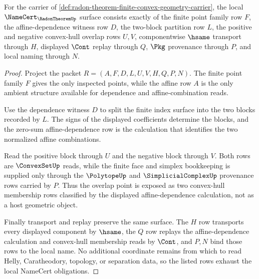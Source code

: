 \begin{theorem}
\label{thm:radon-theorem-namecert-obligations}
For the carrier of \autoref{def:radon-theorem-finite-convex-geometry-carrier}, the local $\NameCert_{\RadonTheoremUp}$ surface consists exactly of the finite point family row $F$, the affine-dependence witness row $D$, the two-block partition row $L$, the positive and negative convex-hull overlap rows $U,V$, componentwise $\hsame$ transport through $H$, displayed $\Cont$ replay through $Q$, $\Pkg$ provenance through $P$, and local naming through $N$.
\end{theorem}
\begin{proof}
Project the packet $R=(A,F,D,L,U,V,H,Q,P,N)$. The finite point family $F$ gives the only inspected points, while the affine row $A$ is the only ambient structure available for dependence and affine-combination reads.

Use the dependence witness $D$ to split the finite index surface into the two blocks recorded by $L$. The signs of the displayed coefficients determine the blocks, and the zero-sum affine-dependence row is the calculation that identifies the two normalized affine combinations.

Read the positive block through $U$ and the negative block through $V$. Both rows are $\ConvexSetUp$ reads, while the finite face and simplex bookkeeping is supplied only through the $\PolytopeUp$ and $\SimplicialComplexUp$ provenance rows carried by $P$. Thus the overlap point is exposed as two convex-hull membership rows classified by the displayed affine-dependence calculation, not as a host geometric object.

Finally transport and replay preserve the same surface. The $H$ row transports every displayed component by $\hsame$, the $Q$ row replays the affine-dependence calculation and convex-hull membership reads by $\Cont$, and $P,N$ bind those rows to the local name. No additional coordinate remains from which to read Helly, Caratheodory, topology, or separation data, so the listed rows exhaust the local NameCert obligations.
\end{proof}



